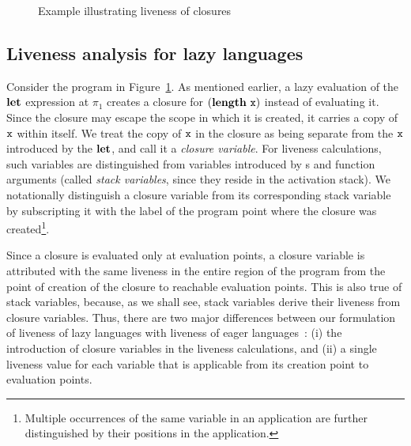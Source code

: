\documentclass[9pt,preprint,nonatbib]{sigplanconf}
\begin{document}
\renewcommand{\pp}[2]{\ensuremath{#1\!\!:\!#2}} %

\begin{figure}[t]
    
  \caption{Example illustrating liveness of closures}\label{fig:lv-closure}
\end{figure}



\subsection{Liveness analysis for lazy languages}
\label{sec:liveness-analysis}
  

Consider the  program in Figure~\ref{fig:lv-closure}.   As mentioned
earlier, a lazy evaluation of the $\mbox{$\mathbf{ let}$}$ expression at $\pi_1$ creates
a closure  for $(\mathbf{length}~\mbox{\tt x})$  instead of  evaluating it.   Since the
closure may escape the scope in which it is created, it carries a copy
of $\mbox{\tt x}$ within itself.  We treat the  copy of $\mbox{\tt x}$ in the closure as
being separate from the $\mbox{\tt x}$ introduced  by the $\mbox{$\mathbf{ let}$}$, and call it a
\emph{closure  variable}.  For  liveness calculations,  such variables
are distinguished  from variables  introduced by  \LET s  and function
arguments  (called \emph{stack  variables},  since they  reside in  the
activation  stack).   We notationally distinguish  a closure  variable
from  its corresponding  stack variable  by subscripting  it with  the
label of the program   point  where   the   closure  was   created\footnote{Multiple
  occurrences  of the  same  variable in  an  application are  further
  distinguished by their positions in the application.}.


  Since a  closure is evaluated  only at evaluation points,  a closure
  variable is attributed  with the same liveness in  the entire region
  of  the  program from  the  point  of  creation  of the  closure  to
  reachable evaluation points.  This is  also true of stack variables,
  because, as we shall see, stack variables derive their liveness from
  closure variables. Thus, there are two major differences between our
  formulation of  liveness of  lazy languages  with liveness  of eager
  languages~\cite{asati14lgc}:   (i)  the   introduction  of   closure
  variables in the  liveness calculations, and (ii)  a single liveness
  value for each  variable that is applicable from  its creation point
  to evaluation points.
\end{document}
